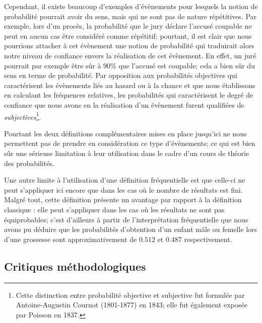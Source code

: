\documentclass[11pt,a4paper]{article}
\begin{document}
Cependant, il existe beaucoup d'exemples d'évènements pour lesquels la notion de probabilité pourrait avoir du sens, mais qui ne sont pas de nature répétitives. Par exemple, lors d'un procès, la probabilité que le jury déclare l'accusé coupable ne peut en aucun cas être considéré comme répétitif; pourtant, il est clair que nous pourrions attacher à cet évènement une notion de probabilité qui traduirait alors notre niveau de confiance envers la réalisation de cet évènement. En effet, un juré pourrait par exemple être sûr à $90\%$ que l'accusé est coupable; cela a bien sûr du sens en terme de probabilité. Par opposition aux probabilités objectives qui caractérisent les évènements liés au hasard ou à la chance et que nous établissons en calculant les fréquences relatives, les probabilités qui caractérisent le degré de confiance que nous avons en la réalisation d'un évènement furent qualifiées de \textit{subjectives}\footnote{Cette distinction entre probabilité objective et subjective fut formulée par Antoine-Augustin Cournot (1801-1877) en 1843; elle fut également exposée par Poisson en 1837.}.

Pourtant les deux définitions complémentaires mises en place jusqu'ici ne nous permettent pas de prendre en considération ce type d'évènements; ce qui est bien sûr une sérieuse limitation à leur utilisation dans le cadre d'un cours de théorie des probabilités.

Une autre limite à l'utilisation d'une définition fréquentielle est que celle-ci ne peut s'appliquer ici encore que dans les cas où le nombre de résultats est fini. Malgré tout, cette définition présente un avantage par rapport à la définition classique : elle peut s'appliquer dans les cas où les résultats ne sont pas équiprobables; c'est d'ailleurs à partir de l'interprétation fréquentielle que nous avons pu déduire que les probabilités d'obtention d'un enfant mâle ou femelle lors d'une grossesse sont approximativement de $0.512$ et $0.487$ respectivement.

\subsection{Critiques méthodologiques}
\end{document}
